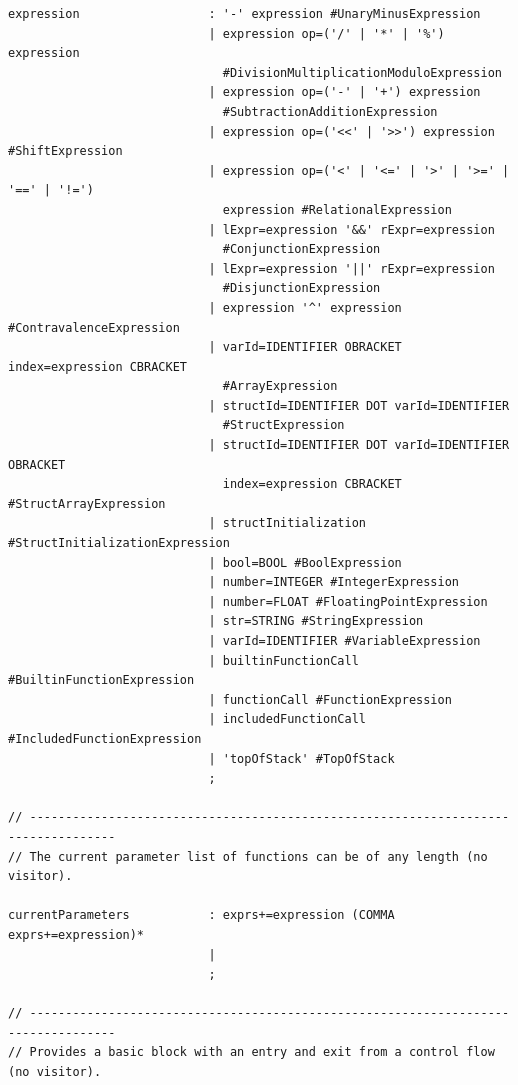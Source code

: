 \begin{lstlisting}[frame=htrbl, caption={Parser rules of grammar {\ttfamily E}}, label={lst:pe}, basicstyle=\scriptsize]
expression                  : '-' expression #UnaryMinusExpression
                            | expression op=('/' | '*' | '%') expression
                              #DivisionMultiplicationModuloExpression
                            | expression op=('-' | '+') expression  
                              #SubtractionAdditionExpression
                            | expression op=('<<' | '>>') expression #ShiftExpression
                            | expression op=('<' | '<=' | '>' | '>=' | '==' | '!=')
                              expression #RelationalExpression
                            | lExpr=expression '&&' rExpr=expression
                              #ConjunctionExpression
                            | lExpr=expression '||' rExpr=expression
                              #DisjunctionExpression
                            | expression '^' expression #ContravalenceExpression
                            | varId=IDENTIFIER OBRACKET index=expression CBRACKET
                              #ArrayExpression
                            | structId=IDENTIFIER DOT varId=IDENTIFIER 
                              #StructExpression
                            | structId=IDENTIFIER DOT varId=IDENTIFIER OBRACKET
                              index=expression CBRACKET #StructArrayExpression
                            | structInitialization #StructInitializationExpression
                            | bool=BOOL #BoolExpression
                            | number=INTEGER #IntegerExpression
                            | number=FLOAT #FloatingPointExpression
                            | str=STRING #StringExpression
                            | varId=IDENTIFIER #VariableExpression
                            | builtinFunctionCall #BuiltinFunctionExpression
                            | functionCall #FunctionExpression
                            | includedFunctionCall #IncludedFunctionExpression
                            | 'topOfStack' #TopOfStack
                            ;

// ----------------------------------------------------------------------------------
// The current parameter list of functions can be of any length (no visitor).

currentParameters           : exprs+=expression (COMMA exprs+=expression)*
                            |
                            ;

// ----------------------------------------------------------------------------------
// Provides a basic block with an entry and exit from a control flow (no visitor).


\end{lstlisting}
